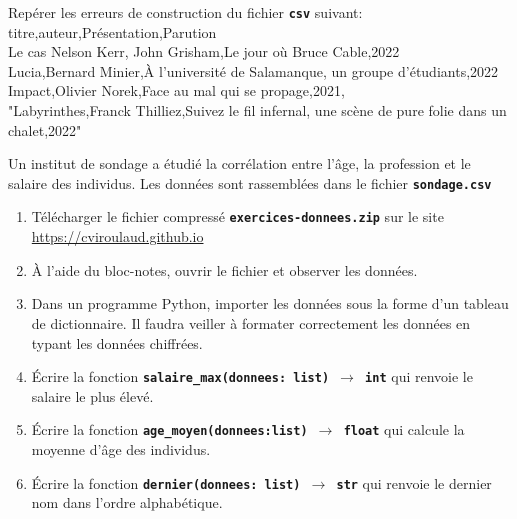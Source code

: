 \documentclass[a4paper,11pt]{article}
\begin{document}
\begin{exo}
    Repérer les erreurs de construction du fichier \textbf{\texttt{csv}} suivant:\\
    titre,auteur,Présentation,Parution\\
    Le cas Nelson Kerr, John Grisham,Le jour où Bruce Cable,2022\\
    Lucia,Bernard Minier,À l'université de Salamanque, un groupe d'étudiants,2022\\
    Impact,Olivier Norek,Face au mal qui se propage,2021,\\
    "Labyrinthes,Franck Thilliez,Suivez le fil infernal, une scène de pure folie dans un chalet,2022"
\end{exo}
\begin{exo}
    Un institut de sondage a étudié la corrélation entre l'âge, la profession et le salaire des individus. Les données sont rassemblées dans le fichier \textbf{\texttt{sondage.csv}}
    \begin{enumerate}
        \item Télécharger le fichier compressé \textbf{\texttt{exercices-donnees.zip}} sur le site \url{https://cviroulaud.github.io}
        \item À l'aide du bloc-notes, ouvrir le fichier et observer les données.
        \item Dans un programme Python, importer les données sous la forme d'un tableau de dictionnaire. Il faudra veiller à formater correctement les données en typant les données chiffrées.
        \item Écrire la fonction \textbf{\texttt{salaire\_max(donnees: list) $\rightarrow$ int}} qui renvoie le salaire le plus élevé.
        \item Écrire la fonction \textbf{\texttt{age\_moyen(donnees:list) $\rightarrow$ float}} qui calcule la moyenne d'âge des individus.
        \item Écrire la fonction \textbf{\texttt{dernier(donnees: list) $\rightarrow$ str}} qui renvoie le dernier nom dans l'ordre alphabétique.
    \end{enumerate}
\end{exo}
\end{document}
